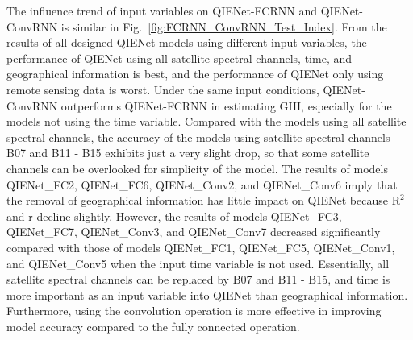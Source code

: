 \documentclass[review]{elsarticle}
\begin{document}
The influence trend of input variables on QIENet-FCRNN and QIENet-ConvRNN is similar in Fig.~\ref{fig:FCRNN_ConvRNN_Test_Index}.
From the results of all designed QIENet models using different input variables, the performance of QIENet using all satellite spectral channels, time, and geographical information is best, and the performance of QIENet only using remote sensing data is worst.
Under the same input conditions, QIENet-ConvRNN outperforms QIENet-FCRNN in estimating GHI, especially for the models not using the time variable.
Compared with the models using all satellite spectral channels, the accuracy of the models using satellite spectral channels B07 and B11 - B15 exhibits just a very slight drop, so that some satellite channels can be overlooked for simplicity of the model.
The results of models QIENet\_FC2, QIENet\_FC6, QIENet\_Conv2, and QIENet\_Conv6 imply that the removal of geographical information has little impact on QIENet because $\mathrm{R^{2}}$ and r decline slightly.
However, the results of models QIENet\_FC3, QIENet\_FC7, QIENet\_Conv3, and QIENet\_Conv7 decreased significantly compared with those of models QIENet\_FC1, QIENet\_FC5, QIENet\_Conv1, and QIENet\_Conv5 when the input time variable is not used.
Essentially, all satellite spectral channels can be replaced by B07 and B11 - B15, and time is more important as an input variable into QIENet than geographical information. Furthermore, using the convolution operation is more effective in improving model accuracy compared to the fully connected operation.
\end{document}
